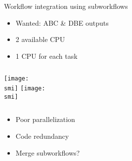 \documentclass[10pt, usenames, dvipsnames]{beamer}
\def\smi{out/ln/updir/mw-gcthesis-oral/library.bib}
\newcommand\blfootnote[1]{%
  \begingroup
  \renewcommand\thefootnote{}\footnote{#1}%
  \addtocounter{footnote}{-1}%
  \endgroup
  }
\begin{document}
\begin{frame}{Workflow integration using subworkflows}
  \centering
  {\small
  \begin{multicols}{3}
    \begin{itemize}
      \item Wanted: ABC \& DBE outputs
      \item 2 available CPU
      \item 1 CPU for each task
    \end{itemize}
  \end{multicols}
  }
  \begin{columns}
    \centering
    \def\smi{out/graphviz/dot_-Tpdf/ln/updir/mw-gcthesis-oral/dot/dag_ABC.pdf}
    \texttt{[image: \\smi]}
    \centering
    \def\smi{out/graphviz/dot_-Tpdf/ln/updir/mw-gcthesis-oral/dot/dag_DBE.pdf}
    \texttt{[image: \\smi]}
  \end{columns}
  \pause
  {\small
  \begin{multicols}{3}
    \begin{itemize}
      \item Poor parallelization
      \item Code redundancy
      \item Merge subworkflows?
    \end{itemize}
  \end{multicols}
  }
\end{frame}
\end{document}
